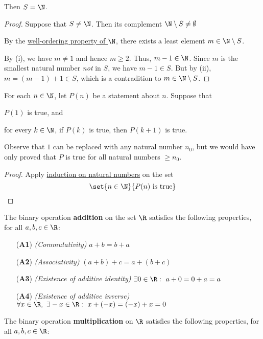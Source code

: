 Then $S=\N$.

\begin{proof}
  Suppose that $S\neq\N$. Then its complement $\N\setminus S\neq\emptyset$

  By the \href{cd7c4d1}{well-ordering property of $\N$}, there exists a least
  element $m\in\N\setminus S$.

  By (i), we have $m\neq 1$ and hence $m\geq2$. Thus, $m-1\in\N$. Since $m$ is
  the smallest natural number \textit{not} in $S$, we have $m-1\in S$. But by
  (ii), $m=(m-1)+1\in S$, which is a contradition to $m\in\N\setminus S$.
\end{proof}

\label{b51ca45}

For each $n\in\N$, let $P(n)$ be a statement about $n$. Suppose that
\begin{enumerati}
  \item $P(1)$ is true, and
  \item for every $k\in\N$, if $P(k)$ is true, then $P(k+1)$ is true.
\end{enumerati}

Observe that $1$ can be replaced with any natural number $n_0$, but we would
have only proved that $P$ is true for all natural numbers $\geq n_0$.

\begin{proof}
  Apply \href{a824f8c}{induction on natural numbers} on the set
  $$
    \set{n\in\N}{P(n)\text{ is true}}
  $$
\end{proof}

\label{bf61f02}

The binary operation \textbf{addition} on the set $\R$ satisfies the following
properties, for all $a,b,c\in\R$:

\begin{itemize}
  \item [(\textbf{A1})] \textit{(Commutativity)} $a+b=b+a$
  \item [(\textbf{A2})] \textit{(Associativity)} $(a+b)+c=a+(b+c)$
  \item [(\textbf{A3})] \textit{(Existence of additive identity)} $\exists0\in\R:\ a+0=0+a=a$
  \item [(\textbf{A4})] \textit{(Existence of additive inverse)} $\forall
        x\in\R,\ \exists -x\in\R:\ x+(-x)=(-x)+x=0$
\end{itemize}

The binary operation \textbf{multiplication} on $\R$ satisfies the following
properties, for all $a,b,c\in\R$:

